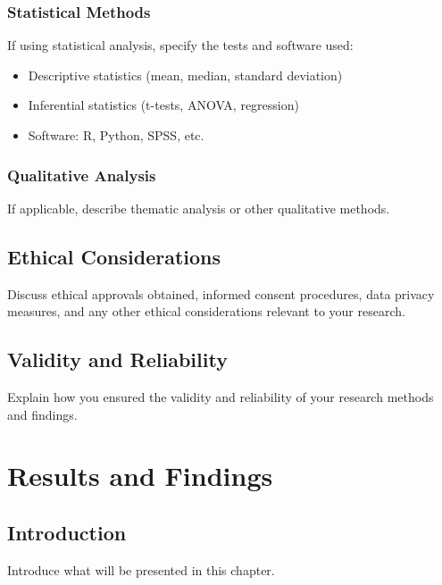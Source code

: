 \documentclass[12pt, a4paper]{report}
\begin{document}
	\subsection{Statistical Methods}
	
	If using statistical analysis, specify the tests and software used:
	
	\begin{itemize}
		\item Descriptive statistics (mean, median, standard deviation)
		\item Inferential statistics (t-tests, ANOVA, regression)
		\item Software: R, Python, SPSS, etc.
	\end{itemize}
	
	\subsection{Qualitative Analysis}
	
	If applicable, describe thematic analysis or other qualitative methods.
	
	\section{Ethical Considerations}
	\label{sec:ethics}
	
	Discuss ethical approvals obtained, informed consent procedures, data privacy measures, and any other ethical considerations relevant to your research.
	
	\section{Validity and Reliability}
	\label{sec:validity}
	
	Explain how you ensured the validity and reliability of your research methods and findings.
	
	\chapter{Results and Findings}
	\label{chap:results}
	
	\section{Introduction}
	
	Introduce what will be presented in this chapter.
	
\end{document}
